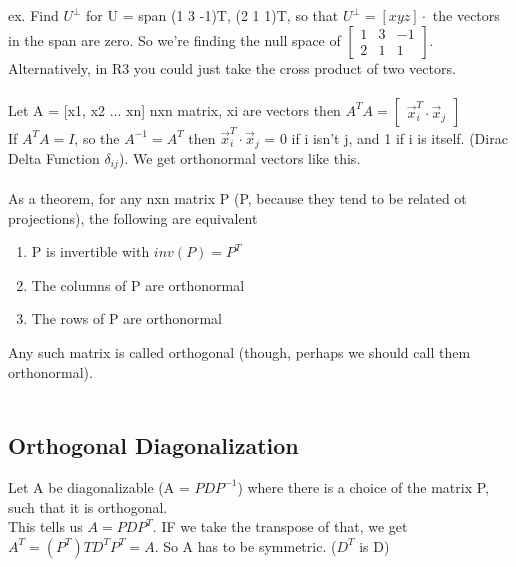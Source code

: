 \documentclass[10pt, twocolumn]{report}
\begin{document}
ex. Find $U^\perp$ for U = span (1 3 -1)T, (2 1 1)T, so that $U^\perp = [x y z] \cdot$ the vectors in the span are zero. So we're finding the null space of $\begin{bmatrix} 1& 3 &-1 \\2 & 1 & 1\end{bmatrix}$. Alternatively, in R3 you could just take the cross product of two vectors. \\\\

Let A = [x1, x2 ... xn] nxn matrix, xi are vectors then
$A^TA = \begin{bmatrix} \vec x_i^T \cdot \vec x_j\end{bmatrix}$\\ If $A^TA = I$, so the $A^{-1} = A^T$ then $\vec x_i^T \cdot \vec x_j$ = 0 if i isn't j, and 1 if i is itself. (Dirac Delta Function $\delta_{ij}$). We get orthonormal vectors like this. \\\\ As a theorem, for any nxn matrix P (P, because they tend to be related ot projections), the following are equivalent
\begin{enumerate}
	\item P is invertible with $inv(P) = P^T$
	\item The columns of P are orthonormal
	\item The rows of P are orthonormal
\end{enumerate}
Any such matrix is called orthogonal (though, perhaps we should call them orthonormal).\\\\

\subsection{Orthogonal Diagonalization}
Let A be diagonalizable (A = $PDP^{-1}$) where there is a choice of the matrix P, such that it is orthogonal. \\ This tells us $A = PDP^T$. IF we take the transpose of that, we get $A^T = (P^T)T D^T P^T = A$. So A has to be symmetric. ($D^T$ is D) \\\\
\end{document}
